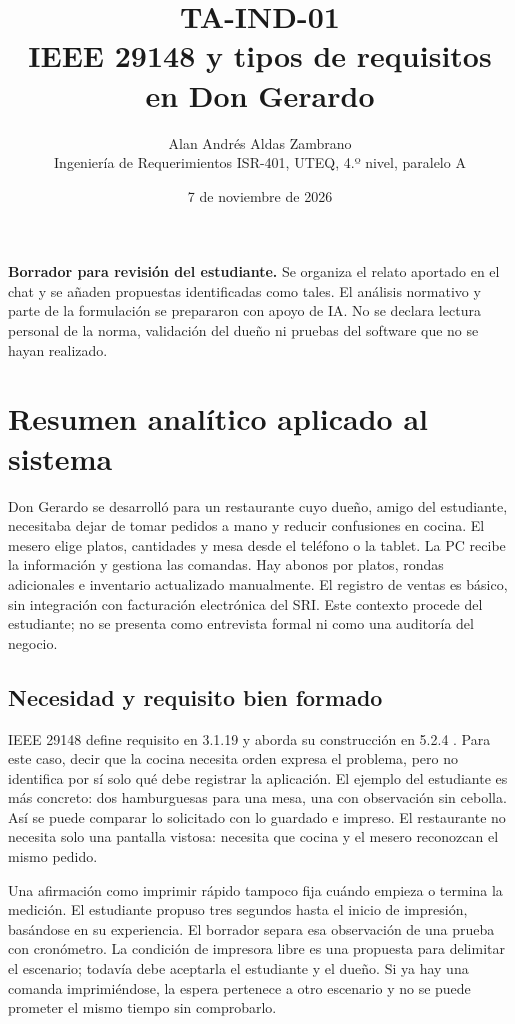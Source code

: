 \documentclass[11pt,a4paper]{article}
\title{\vspace{-1.4cm}TA-IND-01\\\large IEEE 29148 y tipos de requisitos en Don Gerardo}
\author{Alan Andrés Aldas Zambrano\\\small Ingeniería de Requerimientos ISR-401, UTEQ, 4.º nivel, paralelo A}
\date{7 de noviembre de 2026}
\begin{document}
\maketitle
\vspace{-0.6cm}
\textbf{Borrador para revisión del estudiante.} Se organiza el relato aportado en el chat y se añaden propuestas identificadas como tales. El análisis normativo y parte de la formulación se prepararon con apoyo de IA. No se declara lectura personal de la norma, validación del dueño ni pruebas del software que no se hayan realizado.

\section{Resumen analítico aplicado al sistema}
Don Gerardo se desarrolló para un restaurante cuyo dueño, amigo del estudiante, necesitaba dejar de tomar pedidos a mano y reducir confusiones en cocina. El mesero elige platos, cantidades y mesa desde el teléfono o la tablet. La PC recibe la información y gestiona las comandas. Hay abonos por platos, rondas adicionales e inventario actualizado manualmente. El registro de ventas es básico, sin integración con facturación electrónica del SRI. Este contexto procede del estudiante; no se presenta como entrevista formal ni como una auditoría del negocio.

\subsection{Necesidad y requisito bien formado}
IEEE 29148 define requisito en 3.1.19 y aborda su construcción en 5.2.4 \cite{iso29148}. Para este caso, decir que la cocina necesita orden expresa el problema, pero no identifica por sí solo qué debe registrar la aplicación. El ejemplo del estudiante es más concreto: dos hamburguesas para una mesa, una con observación sin cebolla. Así se puede comparar lo solicitado con lo guardado e impreso. El restaurante no necesita solo una pantalla vistosa: necesita que cocina y el mesero reconozcan el mismo pedido.

Una afirmación como imprimir rápido tampoco fija cuándo empieza o termina la medición. El estudiante propuso tres segundos hasta el inicio de impresión, basándose en su experiencia. El borrador separa esa observación de una prueba con cronómetro. La condición de impresora libre es una propuesta para delimitar el escenario; todavía debe aceptarla el estudiante y el dueño. Si ya hay una comanda imprimiéndose, la espera pertenece a otro escenario y no se puede prometer el mismo tiempo sin comprobarlo.
\end{document}
